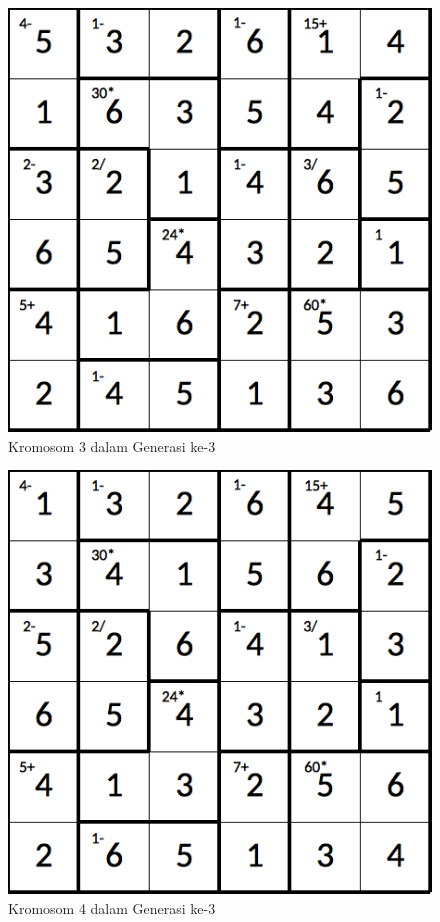 \begin{figure}
\centering
\captionsetup{justification=centering}
\includegraphics[scale=0.333]{Gambar/hybridgenetic/Generation3Chromosome3}
\caption[Kromosom 3 dalam Generasi ke-3]{Kromosom 3 dalam Generasi ke-3}
\label{fig:analisisg3k3}
\end{figure}

\begin{figure}
\centering
\captionsetup{justification=centering}
\includegraphics[scale=0.333]{Gambar/hybridgenetic/Generation3Chromosome4}
\caption[Kromosom 4 dalam Generasi ke-3]{Kromosom 4 dalam Generasi ke-3}
\label{fig:analisisg3k4}
\end{figure}

